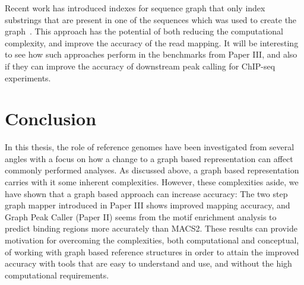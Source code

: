 Recent work has introduced indexes for sequence graph that only index substrings that are present in one of the sequences which was used to create the graph~\cite{haplotypeaware}.
This approach has the potential of both reducing the computational complexity, and improve the accuracy of the read mapping.
It will be interesting to see how such approaches perform in the benchmarks from Paper III, and also if they can improve the accuracy of downstream peak calling for ChIP-seq experiments.

\section{Conclusion}
In this thesis, the role of reference genomes have been investigated from several angles with a focus on how a change to a graph based representation can affect commonly performed analyses.
As discussed above, a graph based representation carries with it some inherent complexities.
However, these complexities aside, we have shown that a graph based approach can increase accuracy: The two step graph mapper introduced in Paper III shows improved mapping accuracy, and Graph Peak Caller (Paper II) seems from the motif enrichment analysis to  predict binding regions more accurately than MACS2.
These results can provide motivation for overcoming the complexities, both computational and conceptual, of working with graph based reference structures in order to attain the improved accuracy with tools that are easy to understand and use, and without the high computational requirements.

